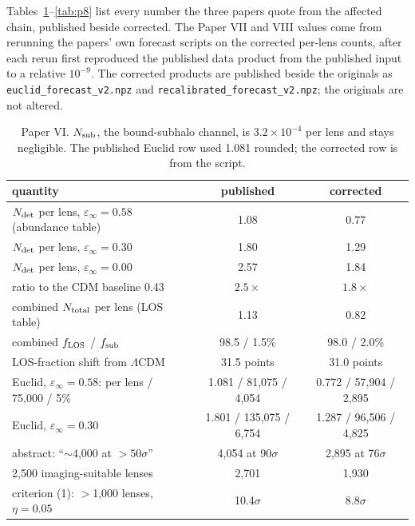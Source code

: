 \documentclass[twocolumn,11pt]{article}
\newcommand{\lcdm}{$\Lambda$CDM}
\newcommand{\einf}{\varepsilon_\infty}
\newcommand{\Ndet}{N_{\rm det}}
\begin{document}
Tables~\ref{tab:p6}--\ref{tab:p8} list every number the three papers
quote from the affected chain, published beside corrected. The Paper VII
and VIII values come from rerunning the papers' own forecast scripts on
the corrected per-lens counts, after each rerun first reproduced the
published data product from the published input to a relative
$10^{-9}$. The corrected products are published beside the originals as
\texttt{euclid\_forecast\_v2.npz} and
\texttt{recalibrated\_forecast\_v2.npz}; the originals are not altered.

\begin{table}
\centering
\caption{Paper VI. $N_{\rm sub}$, the bound-subhalo channel, is
$3.2\times10^{-4}$ per lens and stays negligible. The published
Euclid row used 1.081 rounded; the corrected row is from the script.}
\label{tab:p6}
\small
\setlength{\tabcolsep}{4pt}
\begin{tabular}{lcc}
\toprule
quantity & published & corrected \\
\midrule
$\Ndet$ per lens, $\einf=0.58$ (abundance table)   & 1.08 & 0.77 \\
$\Ndet$ per lens, $\einf=0.30$             & 1.80 & 1.29 \\
$\Ndet$ per lens, $\einf=0.00$             & 2.57 & 1.84 \\
ratio to the CDM baseline 0.43             & $2.5\times$ & $1.8\times$ \\
combined $N_{\rm total}$ per lens (LOS table) & 1.13 & 0.82 \\
combined $f_{\rm LOS}$ / $f_{\rm sub}$     & 98.5 / 1.5\% & 98.0 / 2.0\% \\
LOS-fraction shift from \lcdm              & 31.5 points & 31.0 points \\
Euclid, $\einf=0.58$: per lens / 75,000 / 5\% & 1.081 / 81,075 / 4,054 & 0.772 / 57,904 / 2,895 \\
Euclid, $\einf=0.30$                       & 1.801 / 135,075 / 6,754 & 1.287 / 96,506 / 4,825 \\
abstract: ``$\sim$4,000 at $>50\sigma$''   & 4,054 at 90$\sigma$ & 2,895 at 76$\sigma$ \\
2,500 imaging-suitable lenses              & 2,701 & 1,930 \\
criterion (1): $>$1,000 lenses, $\eta=0.05$ & 10.4$\sigma$ & 8.8$\sigma$ \\
\bottomrule
\end{tabular}
\end{table}
\end{document}
